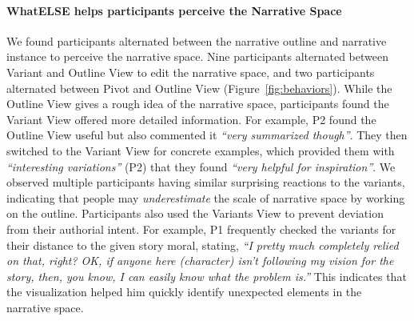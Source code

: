 \paragraph{WhatELSE helps participants perceive the Narrative Space} We found participants alternated between the narrative outline and narrative instance to perceive the narrative space. Nine participants alternated between Variant and Outline View to edit the narrative space, and two participants alternated between Pivot and Outline View (Figure~\ref{fig:behaviors}). While the Outline View gives a rough idea of the narrative space, participants found the Variant View offered more detailed information. For example, P2 found the Outline View useful but also commented it \textit{``very summarized though''}. They then switched to the Variant View for concrete examples, which provided them with \textit{``interesting variations''} (P2) that they found \textit{``very helpful for inspiration''}. We observed multiple participants having similar surprising reactions to the variants, indicating that people may \textit{underestimate} the scale of narrative space by working on the outline. Participants also used the Variants View to prevent deviation from their authorial intent. For example, P1 frequently checked the variants for their distance to the given story moral, stating, \textit{``I pretty much completely relied on that, right? OK, if anyone here (character) isn't following my vision for the story, then, you know, I can easily know what the problem is.''} This indicates that the visualization helped him quickly identify unexpected elements in the narrative space. 


